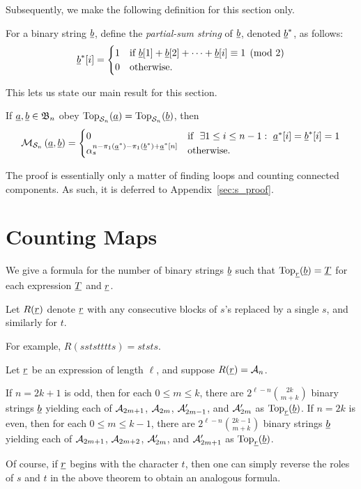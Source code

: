 Subsequently, we make the following definition for this section only.
\begin{definition}
	For a binary string $\ul b$, define the \emph{partial-sum string} of $\ul b$, denoted $\ul b^\ast$, as follows:
	\[
		\ul b^\ast [i] = 
		\begin{cases}
			1 & \text{if } \ul b[1] + \ul b[2] + \dots + \ul b[i] \equiv 1 \pmod{2} \\
			0 & \text{otherwise}.
		\end{cases}
	\]
\end{definition}
This lets us state our main result for this section. 
\begin{theorem}
	If $\ul a, \ul b \in \BB_n$ obey $\Top_{\SS_n}(\ul a) = \Top_{\SS_n}(\ul b)$, then
	\[
		\MM_{\SS_n} \left( \ul a, \ul b \right)
		=
		\begin{cases}
			0 & \text{if }\ \exists 1 \le i \le n-1:\ \ul a^\ast[i] = \ul b^\ast[i] = 1 \\
			\alpha_s^{n - \pi_1(\ul a^\ast) - \pi_1(\ul b^\ast) + \ul a^\ast[n]} & \text{otherwise}.
		\end{cases}
	\]
	\label{thm:s_eval}
\end{theorem}
The proof is essentially only a matter of finding loops and counting connected components.
As such, it is deferred to Appendix~\ref{sec:s_proof}.

\section{Counting Maps}
\label{sec:res_count_maps}
We give a formula for the number of binary strings $\ul b$ such that $\Top_{\ul r}(\ul b) = \ul T$ for each expression $\ul T$ and $\ul r$.  

\begin{definition}
	Let $R(\ul r)$ denote $\ul r$ with any consecutive blocks of $s$'s replaced by a single $s$, and similarly for $t$.
\end{definition}
For example, $R(sststttts) = ststs$.

\begin{proposition}
	Let $\ul r$ be an expression of length $\ell$, and suppose $R(\ul r) = \AA_n$.
	\begin{enumerate}[(i)]
		\ii If $n=2k+1$ is odd, then for each $0 \le m \le k$, there are $2^{\ell-n} \binom{2k}{m+k}$ binary strings $\ul b$ yielding each of $\AA_{2m+1}$, $\AA_{2m}$, $\AA_{2m-1}'$, and $\AA_{2m}'$ as $\Top_{\ul r}(\ul b)$.
		\ii If $n=2k$ is even, then for each $0 \le m \le k-1$, there are $2^{\ell-n} \binom{2k-1}{m+k}$ binary strings $\ul b$ yielding each of $\AA_{2m+1}$, $\AA_{2m+2}$, $\AA_{2m}'$, and $\AA_{2m+1}'$ as $\Top_{\ul r}(\ul b)$.
	\end{enumerate}
	\label{thm:count_maps}
\end{proposition}
Of course, if $\ul r$ begins with the character $t$, then one can simply reverse the roles of $s$ and $t$ in the above theorem to obtain an analogous formula.

